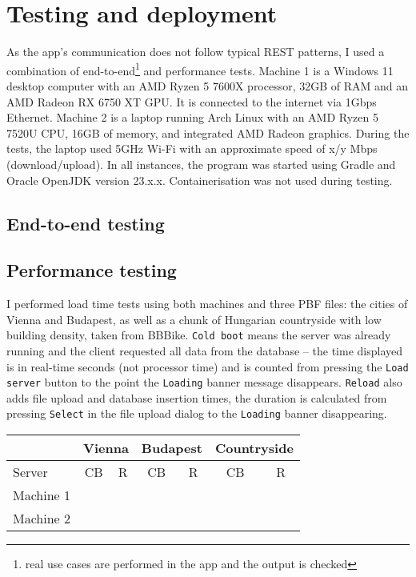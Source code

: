 \chapter{Testing and deployment}

As the app's communication does not follow typical REST patterns, I used a combination of end-to-end\footnote{real use cases are performed in the app and the output is checked} and performance tests.
Machine 1 is a Windows 11 desktop computer with an AMD Ryzen 5 7600X processor, 32GB of RAM and an AMD Radeon RX 6750 XT GPU. It is connected to the internet via 1Gbps Ethernet. Machine 2 is a laptop running Arch Linux with an AMD Ryzen 5 7520U CPU, 16GB of memory, and integrated AMD Radeon graphics. During the tests, the laptop used 5GHz Wi-Fi with an approximate speed of x/y Mbps (download/upload). In all instances, the program was started using Gradle and Oracle OpenJDK version 23.x.x. Containerisation was not used during testing.

\section{End-to-end testing}

\section{Performance testing}

I performed load time tests using both machines and three PBF files: the cities of Vienna and Budapest, as well as a chunk of Hungarian countryside with low building density, taken from BBBike. \verb|Cold boot| means the server was already running and the client requested all data from the database -- the time displayed is in real-time seconds (not processor time) and is counted from pressing the \verb|Load server| button to the point the \verb|Loading| banner message disappears. \verb|Reload| also adds file upload and database insertion times, the duration is calculated from pressing \verb|Select| in the file upload dialog to the \verb|Loading| banner disappearing.

\begin{center}
    \begin{tabular}{l|cc|cc|cc}
        \multicolumn{1}{c}{} & \multicolumn{2}{c}{Vienna} & \multicolumn{2}{c}{Budapest} & \multicolumn{2}{c}{Countryside} \\
        \hline
        Server & CB & R & CB & R & CB & R \\
        \hline
        Machine 1 &  &  &  &  &  &  \\
        Machine 2 &  &  &  &  &  &  \\
        \end{tabular}
\end{center}

